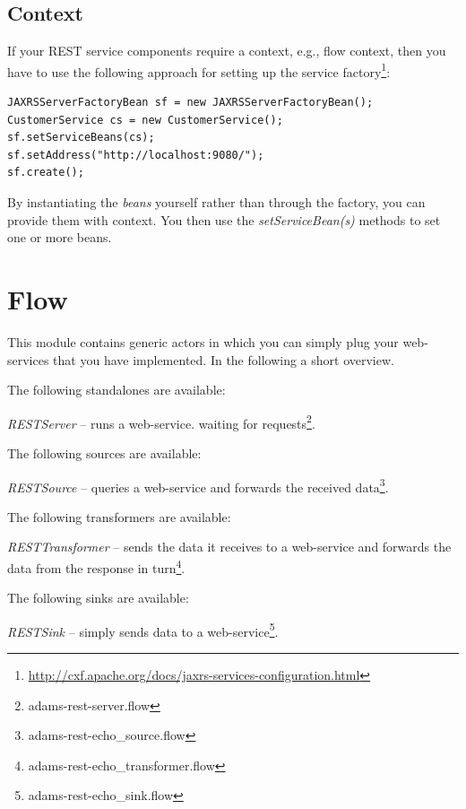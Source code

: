 \documentclass[a4paper]{book}
\begin{document}
\section{Context}
If your REST service components require a context, e.g., flow context, then
you have to use the following approach for setting up the service
factory\footnote{\url{http://cxf.apache.org/docs/jaxrs-services-configuration.html}{}}:
\begin{verbatim}
JAXRSServerFactoryBean sf = new JAXRSServerFactoryBean();
CustomerService cs = new CustomerService();
sf.setServiceBeans(cs);
sf.setAddress("http://localhost:9080/");
sf.create();
\end{verbatim}
By instantiating the \textit{beans} yourself rather than through the factory,
you can provide them with context. You then use the \textit{setServiceBean(s)}
methods to set one or more beans.

\chapter{Flow}
This module contains generic actors in which you can simply plug your 
web-services that you have implemented. In the following a short overview.

The following standalones are available:
\begin{tight_itemize}
	\item \textit{RESTServer} -- runs a web-service. waiting for
	requests\footnote{adams-rest-server.flow}.
\end{tight_itemize}
The following sources are available:
\begin{tight_itemize}
	\item \textit{RESTSource} -- queries a web-service and forwards the received
	data\footnote{adams-rest-echo\_source.flow}.
\end{tight_itemize}
The following transformers are available:
\begin{tight_itemize}
	\item \textit{RESTTransformer} -- sends the data it receives to a web-service
	and forwards the data from the response in
	turn\footnote{adams-rest-echo\_transformer.flow}.
\end{tight_itemize}
The following sinks are available:
\begin{tight_itemize}
	\item \textit{RESTSink} -- simply sends data to a web-service\footnote{adams-rest-echo\_sink.flow}.
\end{tight_itemize}



\end{document}
